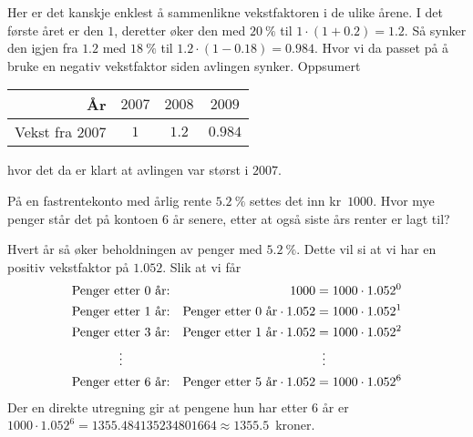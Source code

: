 \documentclass[a4paper,11pt]{article}
\begin{document}
\begin{solution}
  Her er det kanskje enklest å sammenlikne vekstfaktoren i de ulike årene.  I
  det første året er den $1$, deretter øker den med $\SI{20}{\percent}$ til $1
  \cdot (1 + \num{0.2}) = \num{1.2}$. Så synker den igjen fra $\num{1.2}$ med
  $\SI{18}{\percent}$ til $\num{1.2} \cdot (1-\num{0.18}) = \num{0.984}$.
  Hvor vi da passet på å bruke en negativ vekstfaktor siden avlingen synker.
  Oppsumert

  \begin{center}
    \begin{tabular}{r|c c c}
      \toprule
      År & $2007$    & $2008$      & $2009$\\
      \midrule
      Vekst fra $2007$ & $\num{1}$ & $\num{1.2}$ & $\num{0.984}$ \\
      \bottomrule
    \end{tabular}
  \end{center}

  hvor det da er klart at avlingen var størst i $2007$.
\end{solution}


\begin{problem}[5]
  \label{problem:1.5-5-oving-02-2019-MAT-0001}
  På en fastrentekonto med årlig rente $\SI{5.2}{\percent}$ settes det inn
  kr~$\num{1000}$. Hvor mye penger står det på kontoen $6$ år senere, etter at
  også siste års renter er lagt til? 
\end{problem}

\begin{solution}
  Hvert år så øker beholdningen av penger med $\SI{5.2}{\percent}$. Dette vil
  si at vi har en positiv vekstfaktor på $\num{1.052}$. Slik at vi får 
  \begin{align*}
    \text{Penger etter $0$ år:} &&                                   \num{1000} &= \num{1000} \cdot \num{1.052}^0 \\
    \text{Penger etter $1$ år:} && \text{Penger etter $0$ år} \cdot \num{1.052} &= \num{1000} \cdot \num{1.052}^1 \\
    \text{Penger etter $3$ år:} && \text{Penger etter $1$ år} \cdot \num{1.052} &= \num{1000} \cdot \num{1.052}^2 \\
    \vdotswithin{\text{Penger etter $0$ år:}} && & \vdotswithin{=} \\
    \text{Penger etter $6$ år:} && \text{Penger etter $5$ år} \cdot \num{1.052} &= \num{1000} \cdot \num{1.052}^6 \\
  \end{align*}
  Der en direkte utregning gir at pengene hun har etter $6$ år er $\num{1000}
  \cdot \num{1.052}^6 = \num{1355.484135234801664} \approx
  \num{1355.5}$~kroner.
\end{solution}
\end{document}
